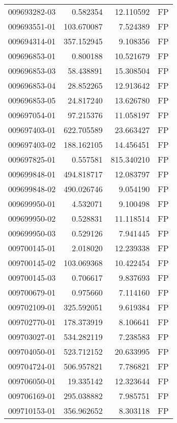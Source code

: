 \begin{tabular}{lrrl}
009693282-03 &    0.582354 &      12.110592 &   FP \\
009693551-01 &  103.670087 &       7.524389 &   FP \\
009694314-01 &  357.152945 &       9.108356 &   FP \\
009696853-01 &    0.800188 &      10.521679 &   FP \\
009696853-03 &   58.438891 &      15.308504 &   FP \\
009696853-04 &   28.852265 &      12.913642 &   FP \\
009696853-05 &   24.817240 &      13.626780 &   FP \\
009697054-01 &   97.215376 &      11.058197 &   FP \\
009697403-01 &  622.705589 &      23.663427 &   FP \\
009697403-02 &  188.162105 &      14.456451 &   FP \\
009697825-01 &    0.557581 &     815.340210 &   FP \\
009699848-01 &  494.818717 &      12.083797 &   FP \\
009699848-02 &  490.026746 &       9.054190 &   FP \\
009699950-01 &    4.532071 &       9.100498 &   FP \\
009699950-02 &    0.528831 &      11.118514 &   FP \\
009699950-03 &    0.529126 &       7.941445 &   FP \\
009700145-01 &    2.018020 &      12.239338 &   FP \\
009700145-02 &  103.069368 &      10.422454 &   FP \\
009700145-03 &    0.706617 &       9.837693 &   FP \\
009700679-01 &    0.975660 &       7.114160 &   FP \\
009702109-01 &  325.592051 &       9.619384 &   FP \\
009702770-01 &  178.373919 &       8.106641 &   FP \\
009703027-01 &  534.282119 &       7.238583 &   FP \\
009704050-01 &  523.712152 &      20.633995 &   FP \\
009704724-01 &  506.957821 &       7.786821 &   FP \\
009706050-01 &   19.335142 &      12.323644 &   FP \\
009706169-01 &  295.038882 &       7.985751 &   FP \\
009710153-01 &  356.962652 &       8.303118 &   FP \\

\end{tabular}
